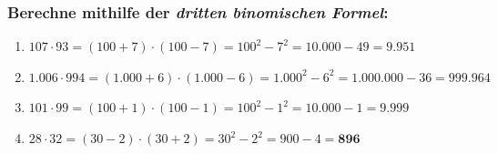 \documentclass[a4paper,12pt]{article} %
\begin{document}
\subsubsection{Berechne mithilfe der \textit{dritten binomischen Formel}:} %

\begin{enumerate}[label=\alph*)]

  \item \(107 \cdot 93 = (100 + 7) \cdot (100 - 7) = 100^2 - 7^2 = 10.000 - 49 = \mathbf{9.951}\) %

  \item \(1.006 \cdot 994 = (1.000 + 6) \cdot (1.000 - 6) = 1.000^2 - 6^2 = 1.000.000 - 36 = \mathbf{999.964}\) %

  \item \(101 \cdot 99 = (100 + 1) \cdot (100 - 1) = 100^2 - 1^2 = 10.000 - 1 = \mathbf{9.999}\) %

  \item \(28 \cdot 32 = (30 - 2) \cdot (30 + 2) = 30^2 - 2^2 = 900 - 4 = \mathbf{896}\) %

\end{enumerate}
\end{document}
